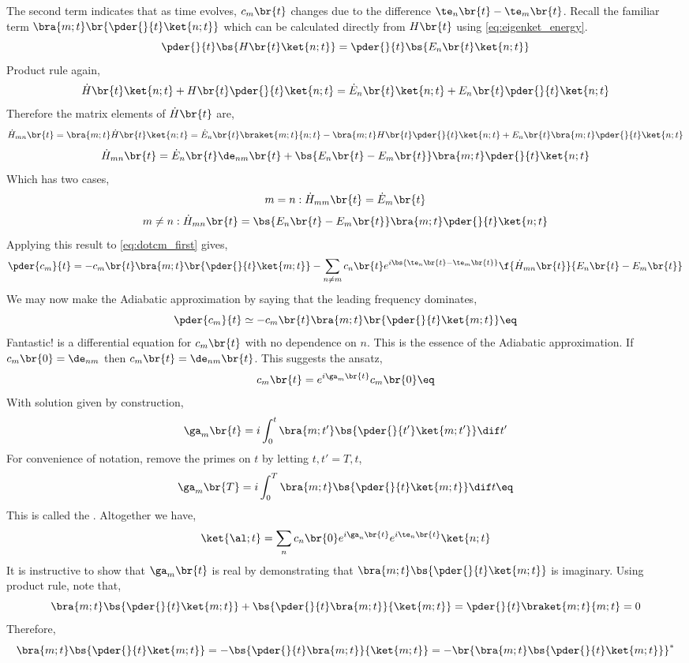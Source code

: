 \documentclass{article}
\begin{document}
The second term indicates that as time evolves, $c_m\br{t}$ changes due to the difference $\te_n\br{t} - \te_m\br{t}$. Recall the familiar term $\bra{m;t}\br{\pder{}{t}\ket{n;t}}$ which can be calculated directly from $H\br{t}$ using \cref{eq:eigenket_energy}.
\[ \pder{}{t}\bs{H\br{t} \ket {n ; t}} = \pder{}{t}\bs{E_n\br{t} \ket{n ; t}} \]
Product rule again,
\[ \dot H\br{t} \ket {n ; t} + H\br{t} \pder{}{t}\ket {n ; t} = \dot E_n\br{t} \ket{n ; t} + E_n\br{t} \pder{}{t}\ket{n ; t} \]
Therefore the matrix elements of $\dot H\br{t}$ are,
\[ \dot{H}_{mn}\br{t} = \bra{m;t}\dot H\br{t} \ket {n ; t} = \dot E_n\br{t} \braket{m;t}{n ; t} - \bra{m;t}H\br{t} \pder{}{t}\ket {n ; t} + E_n\br{t} \bra{m;t}\pder{}{t}\ket{n ; t}\]
\[ \dot{H}_{mn}\br{t} = \dot E_n\br{t}\de_{nm}\br{t} + \bs{E_n\br{t} - E_m\br{t}} \bra{m;t} \pder{}{t}\ket{n;t} \]
Which has two cases,
\[ m = n : \dot{H}_{mm}\br{t} = \dot E_m\br{t} \]
\[ m\neq n: \dot{H}_{mn}\br{t} = \bs{E_n\br{t} - E_m\br{t}} \bra{m;t} \pder{}{t}\ket{n;t}\]
Applying this result to \cref{eq:dotcm_first} gives,
\[ \pder{c_m}{t} = - c_m\br{t}\bra{m;t}\br{\pder{}{t}\ket{m;t}} - \sum_{n \neq m} c_n\br{t}e^{i \bs{\te_n\br{t} - \te_m\br{t}}}\f{\dot{H}_{mn}\br{t}}{E_n\br{t} - E_m\br{t}} \]
We may now make the Adiabatic approximation by saying that the leading frequency dominates,
\[ \pder{c_m}{t} \simeq - c_m\br{t}\bra{m;t}\br{\pder{}{t}\ket{m;t}} \eq \label{eq:de_for_c_m}\]
Fantastic!  is a differential equation for $c_m\br{t}$ with no dependence on $n$. This is the essence of the Adiabatic approximation. If $c_m\br{0} = \de_{nm}$ then $c_m\br{t} = \de_{nm}\br{t}$. This suggests the ansatz,
\[ c_m\br{t} = e^{i \ga_m\br{t}} c_m\br{0} \eq \label{eq:definition_of_ga} \]
With solution given by construction,
\[ \ga_m\br{t} = i \int_{0}^{t} \bra{m; t'} \bs{\pder{}{t'} \ket{m; t'}} \dif t' \]
For convenience of notation, remove the primes on $t$ by letting $t, t' = T, t$,
\[ \ga_m\br{T} = i \int_{0}^{T} \bra{m; t} \bs{\pder{}{t} \ket{m; t}} \dif t \eq \label{eq:ga_m_time}\]
This is called the . Altogether we have,
\[ \ket{\al ; t} = \sum_{n} c_n\br{0} e^{i \ga_n\br{t}} e^{i \te_n\br{t}} \ket{n ; t} \]
It is instructive to show that $\ga_m\br{t}$ is real by demonstrating that $\bra{m; t} \bs{\pder{}{t} \ket{m; t}}$ is imaginary. Using product rule, note that,
\[ \bra{m; t} \bs{\pder{}{t} \ket{m; t}} + \bs{\pder{}{t}\bra{m; t}} { \ket{m; t}} = \pder{}{t}\braket{m; t}{m; t} = 0 \]
Therefore,
\[ \bra{m; t} \bs{\pder{}{t} \ket{m; t}} = - \bs{\pder{}{t}\bra{m; t}} { \ket{m; t}} = - \br{\bra{m; t} \bs{\pder{}{t} \ket{m; t}}}^* \]
\end{document}

